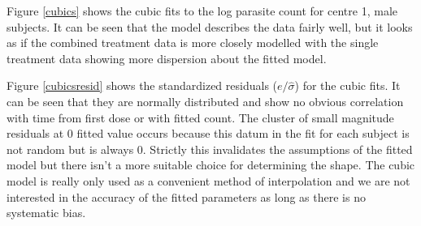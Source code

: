 Figure \ref{cubics} shows the cubic fits to the log parasite count for centre 1, male subjects. It can be seen that the model describes the data fairly well, but it looks as if the combined treatment data is more closely modelled with the single treatment data showing more dispersion about the fitted model. 

Figure \ref{cubicsresid} shows the standardized residuals ($e/\hat{\sigma}$) for the cubic fits. It can be seen that they are normally distributed and show no obvious correlation with time from first dose or with fitted count. The cluster of small magnitude residuals at 0 fitted value occurs because this datum in the fit for each subject is not random but is always 0. Strictly this invalidates the assumptions of the fitted model but there isn't a more suitable choice for determining the shape. The cubic model is really only used as a convenient method of interpolation and we are not interested in the accuracy of the fitted parameters as long as there is no systematic bias. 

